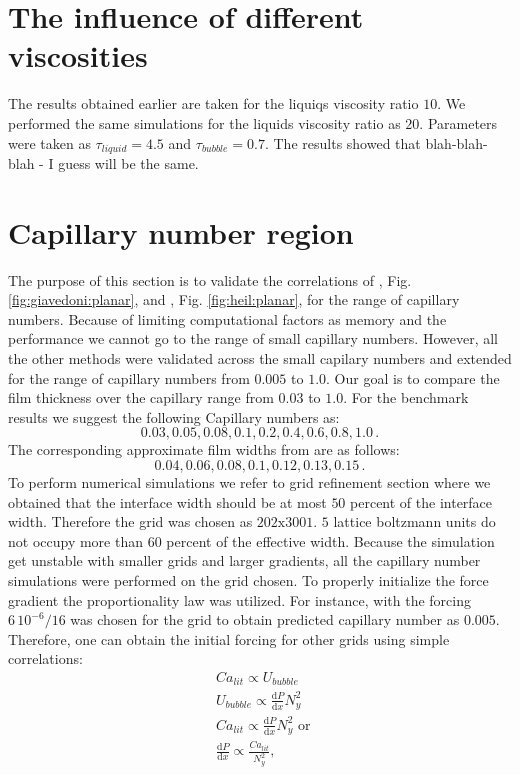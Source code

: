 \documentclass{article}
\begin{document}
\section{The influence of different viscosities}
The results obtained earlier are taken for the liquiqs viscosity ratio $10$.
We performed the same simulations for the liquids viscosity ratio as $20$.
Parameters were taken as $\tau_{liquid}=4.5$ and $\tau_{bubble}=0.7$. 
{\color{red} The results showed that blah-blah-blah - I guess will be the same}.

\section{Capillary number region}
The purpose of this section is to validate the correlations of
\citet{giavedoni-numerical}, Fig. \ref{fig:giavedoni:planar}, and
\citet{heil-bretherton}, Fig. \ref{fig:heil:planar}, for the range of capillary
numbers. Because of limiting computational factors as memory and the
performance we cannot go to the range of small
capillary numbers. However, all the other methods were validated across the
small capilary numbers and extended for the range of capillary numbers from
$0.005$ to $1.0$. Our goal is to compare the film thickness over the capillary
range from $0.03$ to $1.0$.  For the
benchmark
results we
suggest the following Capillary numbers as:
\begin{equation}
0.03,0.05,0.08,0.1,0.2,0.4,0.6,0.8,1.0\, .
\end{equation}
The corresponding approximate film widths from \cite{giavedoni-numerical} are as
follows:
\begin{equation}
0.04,0.06,0.08,0.1,0.12,0.13,0.15\,.
\end{equation}
To perform numerical simulations we refer
to
grid refinement section where we obtained that the interface width should be
at most $50$ percent of the interface width. Therefore the grid was chosen as
$202 \mathrm{x} 3001$. $5$ lattice boltzmann units do not occupy more than $60$
percent of the effective width. Because the simulation get unstable with
smaller grids and larger gradients, all the capillary number simulations were
performed on the grid chosen. To properly initialize the force gradient the
proportionality law was utilized. For instance, with the forcing
$6\,10^{-6}/16$ was chosen for the grid to obtain predicted capillary number as
$0.005$. Therefore, one can obtain the initial forcing for other grids using
simple correlations: 
\begin{equation}
\begin{aligned}
&Ca_{lit} \propto U_{bubble}\\
&U_{bubble} \propto \frac{\mathrm{d}P}{\mathrm{d}x} N_y^2\\ 
&Ca_{lit} \propto \frac{\mathrm{d}P}{\mathrm{d} x} N_y^2 \text{ or }\\
&\frac{\mathrm{d}P}{\mathrm{d} x} \propto \frac{Ca_{lit}}{N_y^2},
\end{aligned}
\end{equation}
\end{document}

